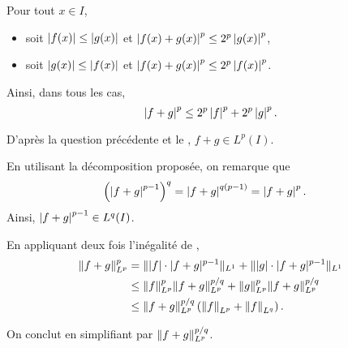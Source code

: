 \begin{solution}
\begin{reponses}
\item Pour tout $x \in I$,
\begin{itemize}
\item soit $\left| f(x) \right| \leq \left| g(x) \right|$ et $\left| f(x) + g(x) \right|^p \leq 2^p \left| g(x) \right|^p$,
\item soit $\left| g(x) \right| \leq \left| f(x) \right|$ et $\left| f(x) + g(x) \right|^p \leq 2^p \left| f(x) \right|^p$.
\end{itemize}
Ainsi, dans tous les cas,
\[
\left| f + g \right|^p \leq 2^p \left| f \right|^p + 2^p \left| g \right|^p.
\]

\item D'après la question précédente et le , $f + g \in L^p(I)$.

\item En utilisant la décomposition proposée, on remarque que
\begin{align*}
\left(\left| f + g \right|^{p-1}\right)^q
&= \left| f + g \right|^{q(p-1)}
= \left| f + g \right|^p.
\end{align*}
Ainsi, $\left| f + g \right|^{p-1} \in L^q(I)$.

En appliquant deux fois l'inégalité de ,
\begin{align*}
\Vert f + g \Vert_{L^p}^p
&= \Vert |f| \cdot |f + g|^{p-1} \Vert_{L^1}
+ \Vert |g| \cdot |f + g|^{p-1} \Vert_{L^1}\\
&\leq \norm{f}_{L^p}^p \norm{f + g}_{L^p}^{p/q}
+ \norm{g}_{L^p}^p \norm{f + g}_{L^p}^{p/q}\\
&\leq \norm{f + g}_{L^p}^{p/q} \left(\norm{f}_{L^p} + \norm{f}_{L^q}\right).
\end{align*}

On conclut en simplifiant par $\norm{f + g}_{L^p}^{p/q}$.
\end{reponses}
\end{solution}


